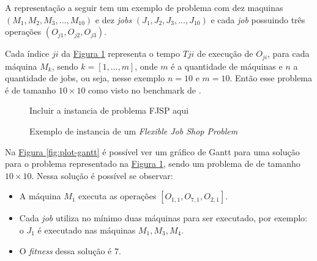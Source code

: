             A representação a seguir tem um exemplo de problema com dez maquinas $(M_1, M_2, M_3, ..., M_{10})$ e dez \textit{jobs} $(J_1, J_2, J_3, ..., J_{10})$ e cada \textit{job} possuindo três operações $(O_{j1}, O_{j2}, O_{j3})$.\hfill\vspace{\onelineskip}

            Cada índice $ji$ da 
            \hyperref[fig:ex-instancia-problema-FJSP]{Figura \ref{fig:ex-instancia-problema-FJSP}} 
            representa o tempo $T{ji}$ de execução de $O_{ji}$, para cada máquina $M_k$, 
            sendo $k=[1, ..., m]$, onde $m$ é a quantidade de máquinas e $n$ a quantidade de jobs, ou seja, nesse exemplo $n=10$ e $m=10$.\newline
            Então esse problema é de tamanho $10\times10$ como visto no benchmark de \cite{Kacem2002}.\hfill

            \begin{figure}[ht]
                \centering
                \small{Incluir a instancia de problema FJSP aqui}
                \caption{Exemplo de instancia de um \textit{Flexible Job Shop Problem}}
                \label{fig:ex-instancia-problema-FJSP}
            \end{figure}



            Na 
            \hyperref[fig:plot-gantt]{Figura \ref{fig:plot-gantt}} 
            é possível ver um gráfico de Gantt para uma solução para o problema representado na 
            \hyperref[fig:ex-instancia-problema-FJSP]{Figura \ref{fig:ex-instancia-problema-FJSP}}, 
            sendo um problema de \cite{Kacem2002} de tamanho $10\times10$. Nessa solução é possível se observar:
            \begin{itemize}
                \item A máquina $M_1$ executa as operações $[O_{1,1}, O_{7,1}, O_{2,1}]$.
                \item Cada \textit{job} utiliza no mínimo duas máquinas para ser executado, por exemplo: o $J_1$ é executado nas máquinas $M_1 , M_3, M_4$.
                \item O \textit{fitness} dessa solução é $7$.
            \end{itemize}
            

